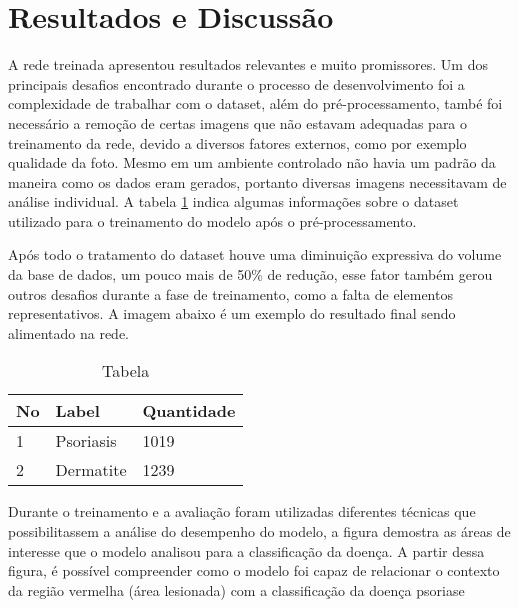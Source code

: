 \section{Resultados e Discussão}

A rede treinada apresentou resultados relevantes e muito promissores. Um dos principais desafios encontrado durante o processo de desenvolvimento foi a complexidade de trabalhar com o dataset, além do pré-processamento, també foi necessário a remoção de certas imagens que não estavam adequadas para o treinamento da rede, devido a diversos fatores externos, como por exemplo qualidade da foto. Mesmo em um ambiente controlado não havia um padrão da maneira como os dados eram gerados, portanto diversas imagens necessitavam de análise individual. A tabela \ref{tab:db-table} indica algumas informações sobre o dataset utilizado para o treinamento do modelo após o pré-processamento. 

Após todo o tratamento do dataset houve uma diminuição expressiva do volume da base de dados, um pouco mais de 50\% de redução, esse fator também gerou outros desafios durante a fase de treinamento, como a falta de elementos representativos. A imagem abaixo é um exemplo do resultado final sendo alimentado na rede.

\newline
\begin{table}[h]
  \centering
  \begin{tabular}{lll}
  \hline
  \multicolumn{1}{|l|}{No} & \multicolumn{1}{l|}{Label} & \multicolumn{1}{l|}{Quantidade} \\ \hline
  1                        & Psoriasis                  & 1019                            \\
  2                        & Dermatite                  & 1239                            \\
  \end{tabular}
  \caption{Tabela }
  \label{tab:db-table}
\end{table}


Durante o treinamento e a avaliação foram utilizadas diferentes técnicas que possibilitassem a análise do desempenho do modelo, a figura demostra as áreas de interesse que o modelo analisou para a classificação da doença. A partir dessa figura, é possível compreender como o modelo foi capaz de relacionar o contexto da região vermelha (área lesionada) com a classificação da doença psoriase


\newpage


